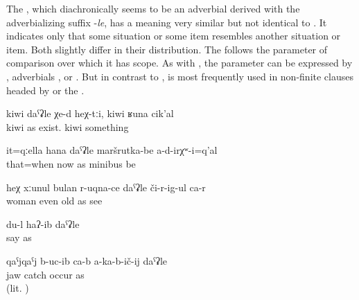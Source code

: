 The   , which diachronically seems to be an adverbial derived with the adverbializing suffix -\textit{le}, has a meaning very similar but not identical to . It indicates only that some situation or some item resembles another situation or item. Both  slightly differ in their distribution. The   follows the parameter of comparison over which it has scope. As with , the parameter can be expressed by  , adverbials , or  . But in contrast to ,  is most frequently used in non-finite clauses headed by   or the  . 
%
\begin{exe}
	\ex	\label{ex:‎This looks like kiwi, similar to kiwi or so}
	\gll	kiwi	daˁʡle	χe-d	heχ-tːi,	kiwi	ʁuna	cik'al\\
		kiwi	as	exist.		kiwi 	something\\
	\glt	{}

	\ex	\label{ex:At that (time) there were no minibuses like now}
	\gll	it=qːella	hana	daˁʡle	maršrutka-be	a-d-irχʷ-i=q'al\\
		that=when	now	as	minibus	be\\
	\glt	{}

	\ex	\label{ex:This woman looks even like old.}
	\gll	heχ	xːunul	bulan	r-uqna-ce	daˁʡle	či-r-ig-ul	ca-r\\
			woman	even	old	as	see	\\
	\glt	{} 

	\ex	\label{ex:as I said}
	\gll	du-l	haʔ-ib daˁʡle\\
			say	as\\
	\glt	{}
	
		\ex	\label{ex:He is keeping his jar as if it fell down}
	\gll	qaˁjqaˁj	b-uc-ib ca-b	a-ka-b-ič-ij	daˁʡle\\
		jaw	catch 	occur	as\\
	\glt	{} (lit. )
\end{exe}

